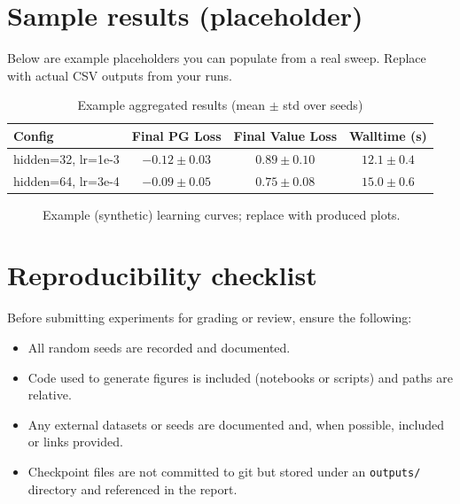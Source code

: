 \documentclass[11pt,a4paper]{article}
\newcommand{\code}[1]{\texttt{#1}}
\begin{document}
\section{Sample results (placeholder)}
Below are example placeholders you can populate from a real sweep. Replace with actual CSV outputs from your runs.

\begin{table}[H]
\centering
\caption{Example aggregated results (mean $\pm$ std over seeds)}
\begin{tabular}{lccc}
\toprule
Config & Final PG Loss & Final Value Loss & Walltime (s) \\
\midrule
hidden=32, lr=1e-3 & $-0.12 \pm 0.03$ & $0.89 \pm 0.10$ & $12.1 \pm 0.4$ \\
hidden=64, lr=3e-4 & $-0.09 \pm 0.05$ & $0.75 \pm 0.08$ & $15.0 \pm 0.6$ \\
\bottomrule
\end{tabular}
\label{tab:sample_results}
\end{table}

\begin{figure}[H]
\centering
{}
\caption{Example (synthetic) learning curves; replace with produced plots.}
\label{fig:example_curves}
\end{figure}

\section{Reproducibility checklist}
Before submitting experiments for grading or review, ensure the following:
\begin{itemize}
  \item All random seeds are recorded and documented.
  \item Code used to generate figures is included (notebooks or scripts) and paths are relative.
  \item Any external datasets or seeds are documented and, when possible, included or links provided.
  \item Checkpoint files are not committed to git but stored under an \code{outputs/} directory and referenced in the report.
\end{itemize}
\end{document}
